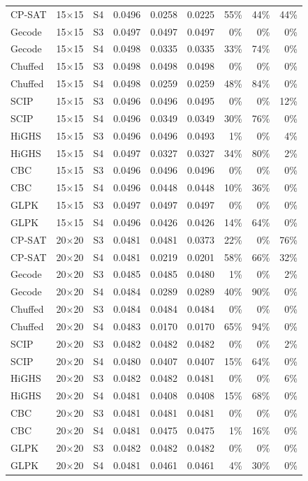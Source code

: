 \begin{tabular}{llrrrrrrr}
CP-SAT & 15$\times$15 & S4 & 0.0496 & 0.0258 & 0.0225 & 55\% & 44\% & 44\% \\
Gecode & 15$\times$15 & S3 & 0.0497 & 0.0497 & 0.0497 & 0\% & 0\% & 0\% \\
Gecode & 15$\times$15 & S4 & 0.0498 & 0.0335 & 0.0335 & 33\% & 74\% & 0\% \\
Chuffed & 15$\times$15 & S3 & 0.0498 & 0.0498 & 0.0498 & 0\% & 0\% & 0\% \\
Chuffed & 15$\times$15 & S4 & 0.0498 & 0.0259 & 0.0259 & 48\% & 84\% & 0\% \\
SCIP & 15$\times$15 & S3 & 0.0496 & 0.0496 & 0.0495 & 0\% & 0\% & 12\% \\
SCIP & 15$\times$15 & S4 & 0.0496 & 0.0349 & 0.0349 & 30\% & 76\% & 0\% \\
HiGHS & 15$\times$15 & S3 & 0.0496 & 0.0496 & 0.0493 & 1\% & 0\% & 4\% \\
HiGHS & 15$\times$15 & S4 & 0.0497 & 0.0327 & 0.0327 & 34\% & 80\% & 2\% \\
CBC & 15$\times$15 & S3 & 0.0496 & 0.0496 & 0.0496 & 0\% & 0\% & 0\% \\
CBC & 15$\times$15 & S4 & 0.0496 & 0.0448 & 0.0448 & 10\% & 36\% & 0\% \\
GLPK & 15$\times$15 & S3 & 0.0497 & 0.0497 & 0.0497 & 0\% & 0\% & 0\% \\
GLPK & 15$\times$15 & S4 & 0.0496 & 0.0426 & 0.0426 & 14\% & 64\% & 0\% \\
\midrule
CP-SAT & 20$\times$20 & S3 & 0.0481 & 0.0481 & 0.0373 & 22\% & 0\% & 76\% \\
CP-SAT & 20$\times$20 & S4 & 0.0481 & 0.0219 & 0.0201 & 58\% & 66\% & 32\% \\
Gecode & 20$\times$20 & S3 & 0.0485 & 0.0485 & 0.0480 & 1\% & 0\% & 2\% \\
Gecode & 20$\times$20 & S4 & 0.0484 & 0.0289 & 0.0289 & 40\% & 90\% & 0\% \\
Chuffed & 20$\times$20 & S3 & 0.0484 & 0.0484 & 0.0484 & 0\% & 0\% & 0\% \\
Chuffed & 20$\times$20 & S4 & 0.0483 & 0.0170 & 0.0170 & 65\% & 94\% & 0\% \\
SCIP & 20$\times$20 & S3 & 0.0482 & 0.0482 & 0.0482 & 0\% & 0\% & 2\% \\
SCIP & 20$\times$20 & S4 & 0.0480 & 0.0407 & 0.0407 & 15\% & 64\% & 0\% \\
HiGHS & 20$\times$20 & S3 & 0.0482 & 0.0482 & 0.0481 & 0\% & 0\% & 6\% \\
HiGHS & 20$\times$20 & S4 & 0.0481 & 0.0408 & 0.0408 & 15\% & 68\% & 0\% \\
CBC & 20$\times$20 & S3 & 0.0481 & 0.0481 & 0.0481 & 0\% & 0\% & 0\% \\
CBC & 20$\times$20 & S4 & 0.0481 & 0.0475 & 0.0475 & 1\% & 16\% & 0\% \\
GLPK & 20$\times$20 & S3 & 0.0482 & 0.0482 & 0.0482 & 0\% & 0\% & 0\% \\
GLPK & 20$\times$20 & S4 & 0.0481 & 0.0461 & 0.0461 & 4\% & 30\% & 0\% \\
\bottomrule
\end{tabular}

